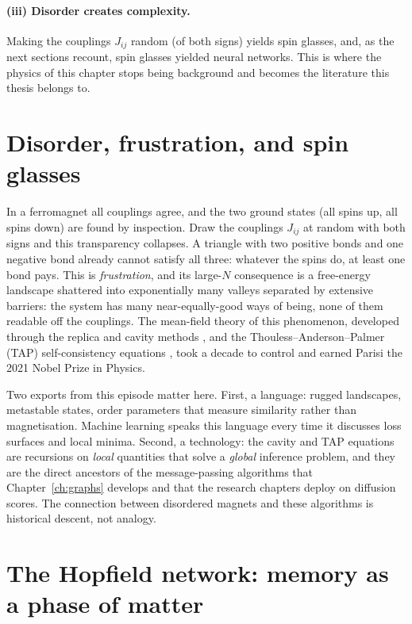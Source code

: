 \paragraph{(iii) Disorder creates complexity.} Making the couplings
$J_{ij}$ random (of both signs) yields spin glasses, and, as the next
sections recount, spin glasses yielded neural networks. This is where the
physics of this chapter stops being background and becomes the
literature this thesis belongs to.

\section{Disorder, frustration, and spin glasses}\label{sec:spinglass}

In a ferromagnet all couplings agree, and the two ground states (all
spins up, all spins down) are found by inspection. Draw the couplings
$J_{ij}$ at random with both signs \citep{edwards1975theory,
sherrington1975solvable} and this transparency collapses. A triangle with
two positive bonds and one negative bond already cannot satisfy all
three: whatever the spins do, at least one bond pays. This is
\emph{frustration}, and its large-$N$ consequence is a free-energy
landscape shattered into exponentially many valleys separated by
extensive barriers: the system has many near-equally-good ways of being,
none of them readable off the couplings. The mean-field theory of this
phenomenon, developed through the replica and cavity methods
\citep{mezard1987spin}, and the Thouless--Anderson--Palmer (TAP)
self-consistency equations \citep{thouless1977solution}, took a decade to
control and earned Parisi the 2021 Nobel Prize in Physics.

Two exports from this episode matter here. First, a language: rugged
landscapes, metastable states, order parameters that measure similarity
rather than magnetisation. Machine learning speaks this language every
time it discusses loss surfaces and local minima. Second, a technology:
the cavity and TAP equations are recursions on \emph{local} quantities
that solve a \emph{global} inference problem, and they are the direct
ancestors of the message-passing algorithms \citep{mezard2009information,
zdeborova2016statistical, krzakala2024statphys} that
Chapter~\ref{ch:graphs} develops and that the research chapters deploy on
diffusion scores. The connection between disordered magnets and these
algorithms is historical descent, not analogy.

\section{The Hopfield network: memory as a phase of matter}
\label{sec:hopfield}

